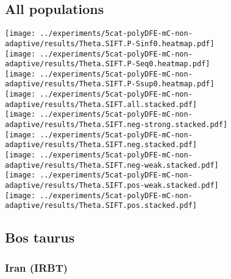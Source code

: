 \subsection{All populations}
\begin{center}
    \texttt{[image: ../experiments/5cat-polyDFE-mC-non-adaptive/results/Theta.SIFT.P-Sinf0.heatmap.pdf]} \\
    \texttt{[image: ../experiments/5cat-polyDFE-mC-non-adaptive/results/Theta.SIFT.P-Seq0.heatmap.pdf]} \\
    \texttt{[image: ../experiments/5cat-polyDFE-mC-non-adaptive/results/Theta.SIFT.P-Ssup0.heatmap.pdf]} \\
    \texttt{[image: ../experiments/5cat-polyDFE-mC-non-adaptive/results/Theta.SIFT.all.stacked.pdf]} \\
    \texttt{[image: ../experiments/5cat-polyDFE-mC-non-adaptive/results/Theta.SIFT.neg-strong.stacked.pdf]} \\
    \texttt{[image: ../experiments/5cat-polyDFE-mC-non-adaptive/results/Theta.SIFT.neg.stacked.pdf]} \\
    \texttt{[image: ../experiments/5cat-polyDFE-mC-non-adaptive/results/Theta.SIFT.neg-weak.stacked.pdf]} \\
    \texttt{[image: ../experiments/5cat-polyDFE-mC-non-adaptive/results/Theta.SIFT.pos-weak.stacked.pdf]} \\
    \texttt{[image: ../experiments/5cat-polyDFE-mC-non-adaptive/results/Theta.SIFT.pos.stacked.pdf]}
\end{center}

\subsection{Bos taurus}

\subsubsection{Iran (IRBT)}

